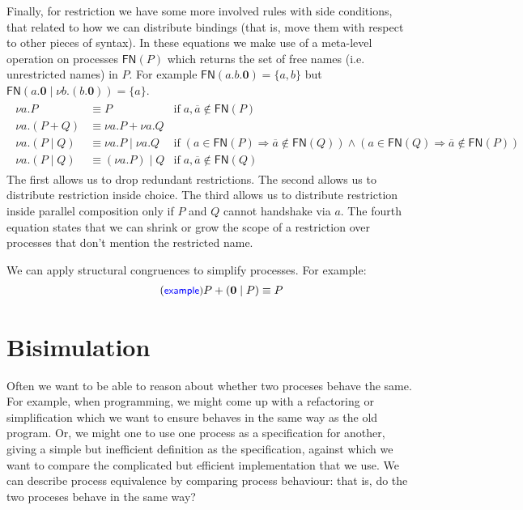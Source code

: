 \documentclass{article}
\newcommand{\exampleLabel}{\tag{\small{\textcolor{blue}{\textsf{example}}}}}
\theoremstyle{definition}
\begin{document}
Finally, for restriction we have some more involved rules
with side conditions, that related to how we can distribute
bindings (that is, move them with respect to other pieces
of syntax). In these equations we make use of a meta-level
operation on processes $\mathsf{FN}(P)$ which returns the
set of free names (i.e. unrestricted names) in $P$.
For example $\mathsf{FN}(a.b.\mathbf{0}) = \{a, b\}$
but $\mathsf{FN}(a.\mathbf{0} \mid \nu b . (b . \mathbf{0})) =
\{a \}$.
%
\begin{align*}
  \begin{array}{rll}
  \nu a . P & \equiv P & \text{if} \; a,
  \overline{a} \not\in \mathsf{FN}(P)  \\
 \nu a . (P + Q) & \equiv \nu a . P + \nu a . Q \\
 \nu a. (P \mid Q) & \equiv \nu a. P \mid \nu a. Q & \text{if}\;(a
  \in \mathsf{FN}(P) \Rightarrow \overline{a} \notin \mathsf{FN}(Q)) 
 \wedge (a \in \mathsf{FN}(Q) \Rightarrow \overline{a} \not\in
  \mathsf{FN}(P))  \\
\nu a. (P \mid Q) & \equiv (\nu a. P) \mid Q &\text{if}\;a,
                                               \overline{a} \not\in
                                               \mathsf{FN}(Q)
\end{array}
\end{align*}
%
The first allows us to drop redundant restrictions. The second allows
us to distribute restriction inside choice. The third allows us to
distribute restriction inside parallel composition only if
$P$ and $Q$ cannot handshake via $a$. The fourth equation
states that we can shrink or grow the scope of a restriction
over processes that don't mention the restricted name.

We can apply structural congruences to simplify processes. For
example:
%
\begin{align*}
  \exampleLabel{}
  P + (\mathbf{0} \mid P) \equiv P
\end{align*}
%

\section{Bisimulation}

Often we want to be able to reason about whether two proceses behave
the same. For example, when programming, we might come up with a
refactoring or simplification which we want to ensure behaves in the
same way as the old program. Or, we might one to use one process
as a specification for another, giving a simple but inefficient
definition as the specification, against which we want to compare the
complicated but efficient implementation that we use. We can
describe process equivalence by comparing process behaviour:
that is, do the two proceses behave in the same way?
\end{document}
